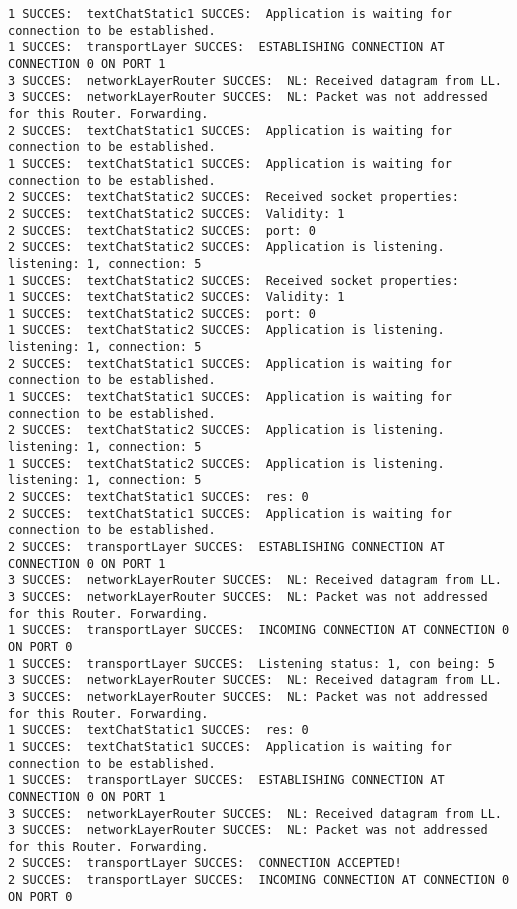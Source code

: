 \begin{lstlisting}[breaklines=true]
1 SUCCES:  textChatStatic1 SUCCES:  Application is waiting for connection to be established.
1 SUCCES:  transportLayer SUCCES:  ESTABLISHING CONNECTION AT CONNECTION 0 ON PORT 1
3 SUCCES:  networkLayerRouter SUCCES:  NL: Received datagram from LL.
3 SUCCES:  networkLayerRouter SUCCES:  NL: Packet was not addressed for this Router. Forwarding.
2 SUCCES:  textChatStatic1 SUCCES:  Application is waiting for connection to be established.
1 SUCCES:  textChatStatic1 SUCCES:  Application is waiting for connection to be established.
2 SUCCES:  textChatStatic2 SUCCES:  Received socket properties:
2 SUCCES:  textChatStatic2 SUCCES:  Validity: 1
2 SUCCES:  textChatStatic2 SUCCES:  port: 0
2 SUCCES:  textChatStatic2 SUCCES:  Application is listening. listening: 1, connection: 5
1 SUCCES:  textChatStatic2 SUCCES:  Received socket properties:
1 SUCCES:  textChatStatic2 SUCCES:  Validity: 1
1 SUCCES:  textChatStatic2 SUCCES:  port: 0
1 SUCCES:  textChatStatic2 SUCCES:  Application is listening. listening: 1, connection: 5
2 SUCCES:  textChatStatic1 SUCCES:  Application is waiting for connection to be established.
1 SUCCES:  textChatStatic1 SUCCES:  Application is waiting for connection to be established.
2 SUCCES:  textChatStatic2 SUCCES:  Application is listening. listening: 1, connection: 5
1 SUCCES:  textChatStatic2 SUCCES:  Application is listening. listening: 1, connection: 5
2 SUCCES:  textChatStatic1 SUCCES:  res: 0
2 SUCCES:  textChatStatic1 SUCCES:  Application is waiting for connection to be established.
2 SUCCES:  transportLayer SUCCES:  ESTABLISHING CONNECTION AT CONNECTION 0 ON PORT 1
3 SUCCES:  networkLayerRouter SUCCES:  NL: Received datagram from LL.
3 SUCCES:  networkLayerRouter SUCCES:  NL: Packet was not addressed for this Router. Forwarding.
1 SUCCES:  transportLayer SUCCES:  INCOMING CONNECTION AT CONNECTION 0 ON PORT 0
1 SUCCES:  transportLayer SUCCES:  Listening status: 1, con being: 5
3 SUCCES:  networkLayerRouter SUCCES:  NL: Received datagram from LL.
3 SUCCES:  networkLayerRouter SUCCES:  NL: Packet was not addressed for this Router. Forwarding.
1 SUCCES:  textChatStatic1 SUCCES:  res: 0
1 SUCCES:  textChatStatic1 SUCCES:  Application is waiting for connection to be established.
1 SUCCES:  transportLayer SUCCES:  ESTABLISHING CONNECTION AT CONNECTION 0 ON PORT 1
3 SUCCES:  networkLayerRouter SUCCES:  NL: Received datagram from LL.
3 SUCCES:  networkLayerRouter SUCCES:  NL: Packet was not addressed for this Router. Forwarding.
2 SUCCES:  transportLayer SUCCES:  CONNECTION ACCEPTED!
2 SUCCES:  transportLayer SUCCES:  INCOMING CONNECTION AT CONNECTION 0 ON PORT 0

\end{lstlisting}
